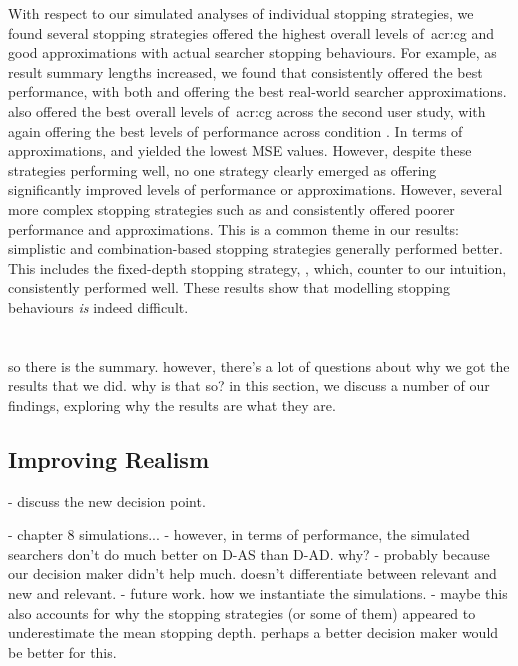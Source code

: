 With respect to our simulated analyses of individual stopping strategies, we found several stopping strategies offered the highest overall levels of~\gls{acr:cg} and good approximations with actual searcher stopping behaviours. For example, as result summary lengths increased, we found that  consistently offered the best performance, with both  and  offering the best real-world searcher approximations.  also offered the best overall levels of~\gls{acr:cg} across the second user study, with  again offering the best levels of performance across condition . In terms of approximations,  and  yielded the lowest MSE values. However, despite these strategies performing well, no one strategy clearly emerged as offering significantly improved levels of performance or approximations. However, several more complex stopping strategies such as  and  consistently offered poorer performance and approximations. This is a common theme in our results: simplistic and combination-based stopping strategies generally performed better. This includes the fixed-depth stopping strategy, , which, counter to our intuition, consistently performed well. These results show that modelling stopping behaviours \emph{is} indeed difficult.

\section{}\label{sec:conclusions:discussion}
so there is the summary.
however, there's a lot of questions about why we got the results that we did.
why is that so?
in this section, we discuss a number of our findings, exploring why the results are what they are.

\subsection{Improving Realism}

- discuss the new decision point.

- chapter 8 simulations...
- however, in terms of performance, the simulated searchers don't do much better on D-AS than D-AD. why?
    - probably because our decision maker didn't help much. doesn't differentiate between relevant and new and relevant.
    - future work. how we instantiate the simulations.
    - maybe this also accounts for why the stopping strategies (or some of them) appeared to underestimate the mean stopping depth. perhaps a better decision maker would be better for this.
    
